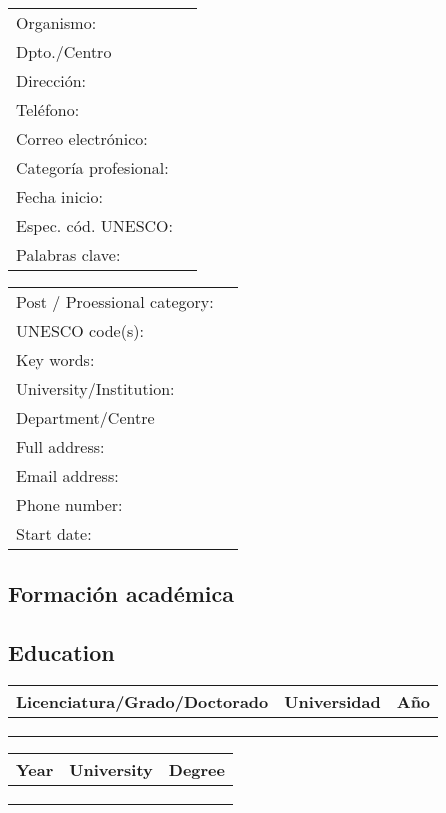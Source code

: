 \documentclass[a4paper]{article}
\def\english{1}
\begin{document}
\ifx\english\undefined
\begin{tabular}{ll}
  Organismo: &  \\
  Dpto./Centro &  \\
  Dirección: &  \\
  Teléfono: &  \\
  Correo electrónico: &  \\
  Categoría profesional: &  \\
  Fecha inicio: &  \\
  Espec. cód. UNESCO: &  \\
  Palabras clave: & 
\end{tabular}
\else
\begin{tabular}{ll}
  Post / Proessional category: &  \\
  UNESCO code(s): &  \\
  Key words: &  \\
  University/Institution: &  \\
  Department/Centre &  \\
  Full address: &  \\
  Email address: &  \\
  Phone number: &  \\
  Start date: &  
\end{tabular}
\fi

\ifx\english\undefined
\subsection{Formación académica}
\else
\subsection{Education}
\fi

\ifx\english\undefined
\begin{tabular}{lll}
  Licenciatura/Grado/Doctorado & Universidad & Año \\
  \hline
   &  &  \\
   &  &  \\
   &  & 
\end{tabular}
\else
\begin{tabular}{lll}
  Year & University & Degree \\
  \hline
   &  &  \\
   &  &  \\
   &  & 
\end{tabular}
\fi
\end{document}
